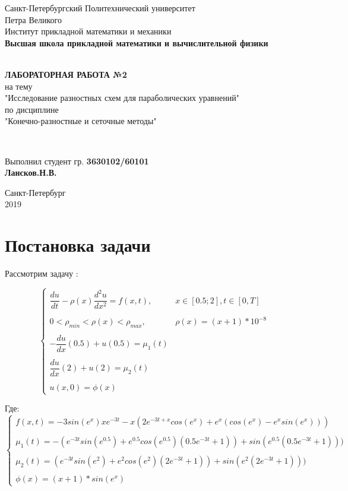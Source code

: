 \documentclass[12pt]{article}
\renewcommand{\listoffigures}{\begingroup  %
\tocsection
\tocfile{\listfigurename}{lof}
\endgroup}
\renewcommand{\listoftables}{\begingroup  %
\tocsection
\tocfile{\listtablename}{lot}
\endgroup}
\begin{document}
\begin{titlepage}
	\center
		Санкт-Петербургский Политехнический 
		университет \\ Петра Великого\\
		Институт прикладной математики и механики
		\\ \textbf{Высшая школа прикладной математики и вычислительной физики}

	\vfill ~
	\textbf{
		\\ \large ЛАБОРАТОРНАЯ РАБОТА №2
	}
	\\	на тему 
	\\ "Исследование разностных схем для параболических уравнений"
	\\ по дисциплине
	\\ "Конечно-разностные и сеточные методы"

	\vfill ~

	Выполнил студент гр. \textbf{3630102/60101} \\
	\textbf{Лансков.Н.В.} \\ 

\vfill

{\large}	Санкт-Петербург
\\ 2019
\end{titlepage}


\tableofcontents 
\newpage
\listoffigures
\newpage
\listoftables
\newpage

\section{Постановка задачи}

Рассмотрим задачу :

$$
\begin{cases}
\dfrac{du}{dt} - \rho(x)\dfrac{d^2u}{dx^2} = f(x, t), & x \in [0.5;2],  t \in [0, T] \\ \\
0 < \rho_{min} < \rho(x) < \rho_{max}, & \rho(x) = (x+1)*10^{-8} \\ \\
 - \dfrac{du}{dx}(0.5) + u(0.5) = \mu_1(t) \\ \\
\dfrac{du}{dx}(2) + u(2) = \mu_2(t) \\ \\
u(x, 0) = \phi(x)
\end{cases}
$$

Где:
$$
\begin{cases}
f(x, t) = -3sin(e^x)xe^{-3t} - x(2e^{-3t+x}cos(e^x)+e^x(cos(e^x) - e^xsin(e^x)))  \\  \\ 
\mu_1(t) = -(e^{-3t}sin(e^{0.5}) + e^{0.5}cos(e^{0.5})(0.5e^{-3t}+1))+sin(e^{0.5}(0.5e^{-3t}+1)))\\ \\
\mu_2(t) = (e^{-3t}sin(e^{2}) + e^{2}cos(e^{2})(2e^{-3t}+1))+sin(e^{2}(2e^{-3t}+1))) \\ \\
\phi(x) = (x+1)*sin(e^x)
\end{cases}
$$
\end{document}
